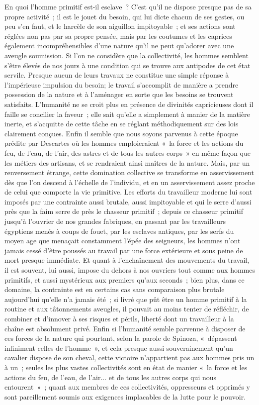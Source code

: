 \documentclass[french,twoside]{book} %
\begin{document}
En quoi l'homme primitif est-il esclave ? C'est qu'il ne dispose presque pas de sa propre activité ; il est le jouet du besoin, qui lui dicte chacun de ses gestes, ou peu s'en faut, et le harcèle de son aiguillon impitoyable ; et ses actions sont réglées non pas par sa propre pensée, mais par les coutumes et les caprices également incompréhensibles d'une nature qu'il ne peut qu'adorer avec une aveugle soumission. Si l'on ne considère que la collectivité, les hommes semblent s'être élevés de nos jours à une condition qui se trouve aux antipodes de cet état servile. Presque aucun de leurs travaux ne constitue une simple réponse à l'impérieuse impulsion du besoin; le travail s'accomplit de manière a prendre possession de la nature et à l'aménager en sorte que les besoins se trouvent satisfaits. L'humanité ne se croit plus en présence de divinités capricieuses dont il faille se concilier la faveur ; elle sait qu'elle a simplement à manier de la matière inerte, et s'acquitte de cette tâche en se réglant méthodiquement sur des lois clairement conçues. Enfin il semble que nous soyons parvenus à cette époque prédite par Descartes où les hommes emploieraient « la force et les actions du feu, de l'eau, de l'air, des astres et de tous les autres corps » en même façon que les métiers des artisans, et se rendraient ainsi maîtres de la nature. Mais, par un renversement étrange, cette domination collective se transforme en asservissement dès que l'on descend à l'échelle de l'individu, et en un asservissement assez proche de celui que comporte la vie primitive. Les efforts du travailleur moderne lui sont imposés par une contrainte aussi brutale, aussi impitoyable et qui le serre d'aussi près que la faim serre de près le chasseur primitif ; depuis ce chasseur primitif jusqu'à l'ouvrier de nos grandes fabriques, en passant par les travailleurs égyptiens menés à coups de fouet, par les esclaves antiques, par les serfs du moyen age que menaçait constamment l'épée des seigneurs, les hommes n'ont jamais cessé d'être poussés au travail par une force extérieure et sous peine de mort presque immédiate. Et quant à l'enchaînement des mouvements du travail, il est souvent, lui aussi, impose du dehors à nos ouvriers tout comme aux hommes primitifs, et aussi mystérieux aux premiers qu'aux seconds ; bien plus, dans ce domaine, la contrainte est en certains cas sans comparaison plus brutale aujourd'hui qu'elle n'a jamais été ; si livré que pût être un homme primitif à la routine et aux tâtonnements aveugles, il pouvait au moins tenter de réfléchir, de combiner et d'innover à ses risques et périls, liberté dont un travailleur à la chaîne est absolument privé. Enfin si l'humanité semble parvenue à disposer de ces forces de la nature qui pourtant, selon la parole de Spinoza, « dépassent infiniment celles de l'homme », et cela presque aussi souverainement qu'un cavalier dispose de son cheval, cette victoire n'appartient pas aux hommes pris un à un ; seules les plus vastes collectivités sont en état de manier « la force et les actions du feu, de l'eau, de l'air... et de tous les autres corps qui nous entourent » ; quant aux membres de ces collectivités, oppresseurs et opprimés y sont pareillement soumis aux exigences implacables de la lutte pour le pouvoir.\par
\end{document}
